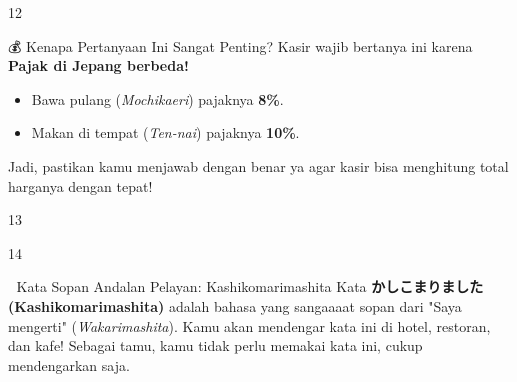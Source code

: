 \begin{convobox}{12}
    \noindent

    \vspace{1.5em}
\end{convobox}

\begin{lessonbox}{💰 Kenapa Pertanyaan Ini Sangat Penting?}
    Kasir wajib bertanya ini karena \textbf{Pajak di Jepang berbeda!} 
    \begin{itemize}
        \item Bawa pulang (\textit{Mochikaeri}) pajaknya \textbf{8\%}.
        \item Makan di tempat (\textit{Ten-nai}) pajaknya \textbf{10\%}.
    \end{itemize}
    Jadi, pastikan kamu menjawab dengan benar ya agar kasir bisa menghitung total harganya dengan tepat!
\end{lessonbox}

\begin{convobox}{13}
    \noindent

    \vspace{1.5em}
\end{convobox}

\begin{convobox}{14}
    \noindent
      

    \vspace{1.5em}
\end{convobox}

\begin{lessonbox}{🎀 Kata Sopan Andalan Pelayan: Kashikomarimashita}
    Kata \textbf{かしこまりました (Kashikomarimashita)} adalah bahasa yang sangaaaat sopan dari "Saya mengerti" (\textit{Wakarimashita}). Kamu akan mendengar kata ini di hotel, restoran, dan kafe! Sebagai tamu, kamu tidak perlu memakai kata ini, cukup mendengarkan saja.
\end{lessonbox}

